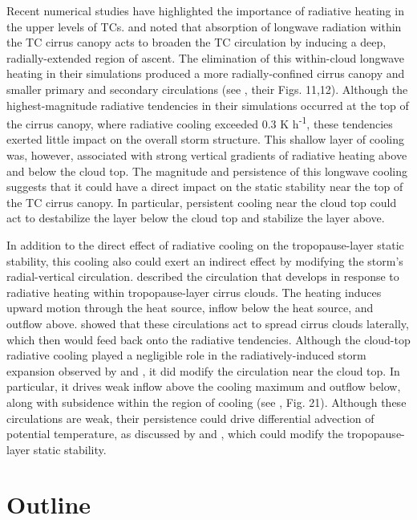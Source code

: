 Recent numerical studies have highlighted the importance of radiative heating in the upper levels of TCs.
\cite{Buetal2014} and \cite{Fovelletal2016} noted that absorption of longwave radiation within the TC cirrus canopy acts to broaden the TC circulation by inducing a deep, radially-extended region of ascent.
The elimination of this within-cloud longwave heating in their simulations produced a more radially-confined cirrus canopy and smaller primary and secondary circulations (see \citeauthor{Buetal2014} \citeyear{Buetal2014}, their Figs. 11,12).
Although the highest-magnitude radiative tendencies in their simulations occurred at the top of the cirrus canopy, where radiative cooling exceeded 0.3 K h\textsuperscript{-1}, these tendencies exerted little impact on the overall storm structure.
This shallow layer of cooling was, however, associated with strong vertical gradients of radiative heating above and below the cloud top.
The magnitude and persistence of this longwave cooling suggests that it could have a direct impact on the static stability near the top of the TC cirrus canopy.
In particular, persistent cooling near the cloud top could act to destabilize the layer below the cloud top and stabilize the layer above.

In addition to the direct effect of radiative cooling on the tropopause-layer static stability, this cooling also could exert an indirect effect by modifying the storm's radial-vertical circulation.
\cite{Durranetal2009} described the circulation that develops in response to radiative heating within tropopause-layer cirrus clouds.
The heating induces upward motion through the heat source, inflow below the heat source, and outflow above.
\cite{Dinhetal2010} showed that these circulations act to spread cirrus clouds laterally, which then would feed back onto the radiative tendencies.
Although the cloud-top radiative cooling played a negligible role in the radiatively-induced storm expansion observed by \cite{Buetal2014} and \cite{Fovelletal2016}, it did modify the circulation near the cloud top.
In particular, it drives weak inflow above the cooling maximum and outflow below, along with subsidence within the region of cooling (see \citeauthor{Fovelletal2016} \citeyear{Fovelletal2016}, Fig. 21).
Although these circulations are weak, their persistence could drive differential advection of potential temperature, as discussed by \cite{ChenZhang2013} and \cite{ChenGopalakrishnan2015},  which could modify the tropopause-layer static stability.

\section{Outline}

